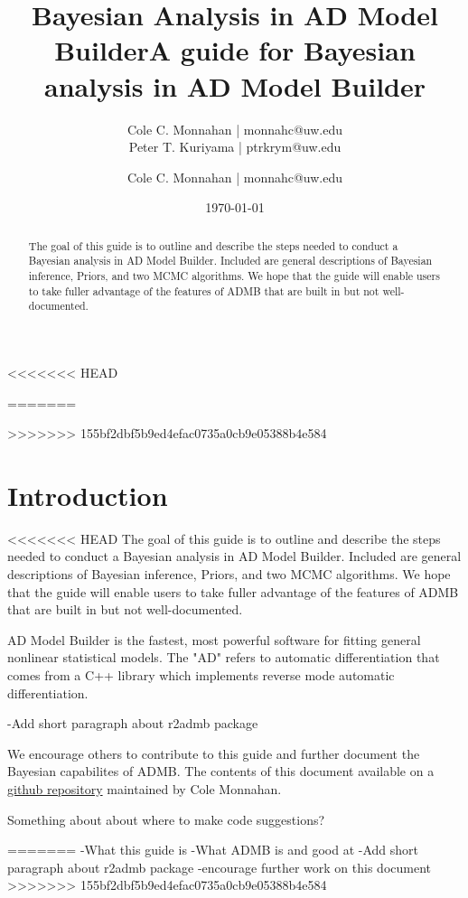 \documentclass{article}\usepackage[]{graphicx}\usepackage[]{color}
\begin{document}
<<<<<<< HEAD
\title{Bayesian Analysis in AD Model Builder}
\author{Cole C. Monnahan | monnahc@uw.edu \\
Peter T. Kuriyama | ptrkrym@uw.edu}

=======
\title{A guide for Bayesian analysis in AD Model Builder}
\author{Cole C. Monnahan | monnahc@uw.edu}
>>>>>>> 155bf2dbf5b9ed4efac0735a0cb9e05388b4e584
\date{\today{}}
\maketitle
\begin{abstract}
  The goal of this guide is to outline and describe the steps needed to conduct a Bayesian analysis in AD 
  Model Builder. Included are general descriptions of Bayesian inference, Priors, and two MCMC algorithms. We
  hope that the guide will enable users to take fuller advantage of the features of ADMB that are built in
  but not well-documented.
  
\end{abstract}

\tableofcontents

\section{Introduction}
<<<<<<< HEAD
  The goal of this guide is to outline and describe the steps needed to conduct a Bayesian analysis in AD 
  Model Builder. Included are general descriptions of Bayesian inference, Priors, and two MCMC algorithms. We
  hope that the guide will enable users to take fuller advantage of the features of ADMB that are built in
  but not well-documented.

  AD Model Builder is the fastest, most powerful software for fitting general nonlinear statistical models.
  The "AD" refers to automatic differentiation that comes from a C++ library which implements reverse mode 
  automatic differentiation. 
  
-Add short paragraph about r2admb package

  We encourage others to contribute to this guide and further document the Bayesian capabilites of ADMB.
  The contents of this document available on a \href{https://github.com/colemonnahan/admb_guide}{github
  repository} maintained by Cole Monnahan. 
  
  Something about about where to make code suggestions?
  
  
=======
-What this guide is
-What ADMB is and good at
-Add short paragraph about r2admb package
-encourage further work on this document
>>>>>>> 155bf2dbf5b9ed4efac0735a0cb9e05388b4e584
\end{document}
